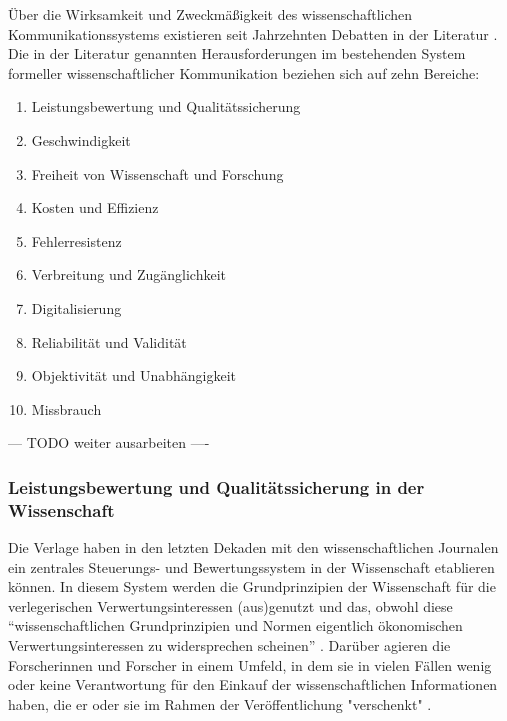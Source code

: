 Über die Wirksamkeit und Zweckmäßigkeit des wissenschaftlichen Kommunikationssystems existieren seit Jahrzehnten Debatten in der Literatur \cite{suchen}. Die in der Literatur genannten Herausforderungen im bestehenden System formeller wissenschaftlicher Kommunikation beziehen sich auf zehn Bereiche:
\begin{enumerate}
\item Leistungsbewertung und Qualitätssicherung
\item Geschwindigkeit
\item Freiheit von Wissenschaft und Forschung
\item Kosten und Effizienz
\item Fehlerresistenz
\item Verbreitung und Zugänglichkeit
\item Digitalisierung
\item Reliabilität und Validität
\item Objektivität und Unabhängigkeit
\item Missbrauch
\end{enumerate}

--- TODO weiter ausarbeiten ----

\subsubsection{Leistungsbewertung und Qualitätssicherung in der Wissenschaft}

Die Verlage haben in den letzten Dekaden mit den wissenschaftlichen Journalen ein zentrales Steuerungs- und Bewertungssystem in der Wissenschaft etablieren können. In diesem System werden die Grundprinzipien der Wissenschaft für die verlegerischen Verwertungsinteressen (aus)genutzt und das, obwohl diese “wissenschaftlichen Grundprinzipien und Normen eigentlich ökonomischen Verwertungsinteressen zu widersprechen scheinen” \cite{hanekop_2006}. Darüber agieren die Forscherinnen und Forscher in einem Umfeld, in dem sie in vielen Fällen wenig oder keine Verantwortung für den Einkauf der wissenschaftlichen Informationen haben, die er oder sie im Rahmen der Veröffentlichung "verschenkt" \cite{steele_2006}.

